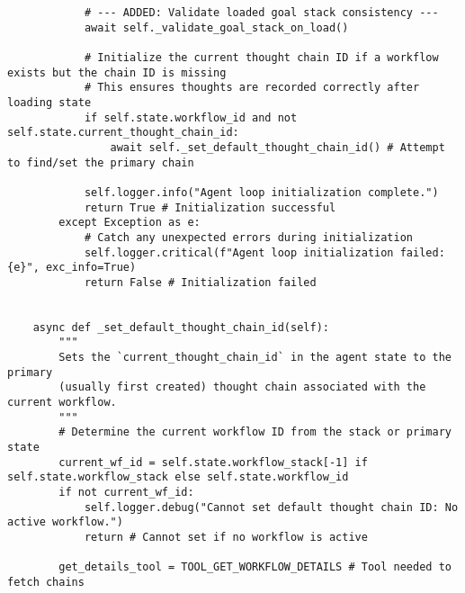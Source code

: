 \documentclass[12pt,a4paper]{article}
\begin{document}
\begin{pageablecode}
\begin{verbatim}
            # --- ADDED: Validate loaded goal stack consistency ---
            await self._validate_goal_stack_on_load()

            # Initialize the current thought chain ID if a workflow exists but the chain ID is missing
            # This ensures thoughts are recorded correctly after loading state
            if self.state.workflow_id and not self.state.current_thought_chain_id:
                await self._set_default_thought_chain_id() # Attempt to find/set the primary chain

            self.logger.info("Agent loop initialization complete.")
            return True # Initialization successful
        except Exception as e:
            # Catch any unexpected errors during initialization
            self.logger.critical(f"Agent loop initialization failed: {e}", exc_info=True)
            return False # Initialization failed


    async def _set_default_thought_chain_id(self):
        """
        Sets the `current_thought_chain_id` in the agent state to the primary
        (usually first created) thought chain associated with the current workflow.
        """
        # Determine the current workflow ID from the stack or primary state
        current_wf_id = self.state.workflow_stack[-1] if self.state.workflow_stack else self.state.workflow_id
        if not current_wf_id:
            self.logger.debug("Cannot set default thought chain ID: No active workflow.")
            return # Cannot set if no workflow is active

        get_details_tool = TOOL_GET_WORKFLOW_DETAILS # Tool needed to fetch chains


\end{verbatim}
\end{pageablecode}
\end{document}
